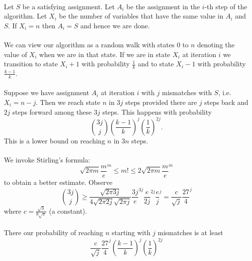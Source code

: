 \documentclass[letterpaper,12pt,oneside,onecolumn]{article}
\begin{document}
\paragraph{}
Let $S$ be a satisfying assignment. Let $A_i$ be the assignment in the $i$-th step of the algorithm. Let $X_i$ be the number of variables that have the same value in $A_i$ and $S$. If $X_i = n$ then $A_i = S$ and hence we are done.
\paragraph{}
We can view our algorithm as a random walk with states $0$ to $n$ denoting the value of $X_i$ when we are in that state. If we are in state $X_i$ at iteration $i$ we transition to state $X_i+1$ with probability $\frac{1}{k}$ and to state $X_i-1$ with probability $\frac{k-1}{k}$.
\paragraph{}
Suppose we have assignment $A_i$ at iteration $i$ with $j$ mismatches with $S$, i.e. $X_i = n-j$. Then we reach state $n$ in $3j$ steps provided there are $j$ steps back and $2j$ steps forward among these $3j$ steps. This happens with probability
$${3j\choose j}(\frac{k-1}{k})^j(\frac{1}{k})^{2j}.$$
This is a lower bound on reaching $n$ in $3n$ steps.
\paragraph{}
We invoke Stirling's formula:
$$\sqrt{2\pi m}\frac{m}{e}^m \leq m! \leq 2\sqrt{2\pi m}\frac{m}{e}^m$$
to obtain a better estimate. Observe
$${3j\choose j} \geq \frac{\sqrt{2\pi 3j}}{4\sqrt{2\pi 2j}\sqrt{2\pi j}}\frac{3j}{e}^{3j}\frac{e}{2j}^{2j}\frac{e}{j}^j = \frac{c}{\sqrt{j}}\frac{27}{4}^j$$
where $c = \frac{\sqrt{3}}{8\sqrt{\pi}}$ (a constant).
\paragraph{}
There our probability of reaching $n$ starting with $j$ mismatches is at least
$$\frac{c}{\sqrt{j}}\frac{27}{4}^j(\frac{k-1}{k})^j(\frac{1}{k})^{2j}$$
\newpage
\section{}

\newpage
\section{}

\newpage
\section{}

\newpage
\section{}
\end{document}
